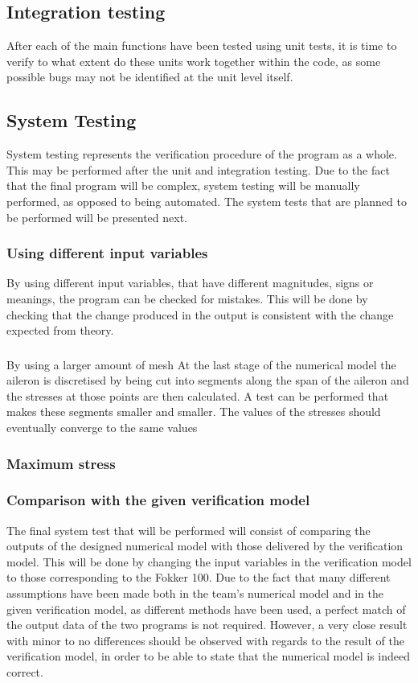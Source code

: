 \subsection{Integration testing}
After each of the main functions have been tested using unit tests, it is time to verify to what extent do these units work together within the code, as some possible bugs may not be identified at the unit level itself.

\subsection{System Testing}
System testing represents the verification procedure of the program as a whole. This may be performed after the unit and integration testing. Due to the fact that the final program will be complex, system testing will be manually performed, as opposed to being automated. The system tests that are planned to be performed will be presented next.

\subsubsection{Using different input variables}
By using different input variables, that have different magnitudes, signs or meanings, the program can be checked for mistakes. This will be done by checking that the change produced in the output is consistent with the change expected from theory.   

\subsubsection{}
By using a larger amount of mesh 
At the last stage of the numerical model the aileron is discretised by being cut into segments along the span
of the aileron and the stresses at those points are then calculated. A test can be performed that makes these
segments smaller and smaller. The values of the stresses should eventually converge to the same values

\subsubsection{Maximum stress}

\subsubsection{Comparison with the given verification model}
The final system test that will be performed will consist of comparing the outputs of the designed numerical model with those delivered by the verification model. This will be done by changing the input variables in the verification model to those corresponding to the Fokker 100. Due to the fact that many different assumptions have been made both in the team's numerical model and in the given verification model, as different methods have been used, a perfect match of the output data of the two programs is not required. However, a very close result with minor to no differences should be observed with regards to the result of the verification model, in order to be able to state that the numerical model is indeed correct. 




